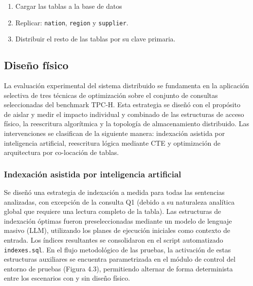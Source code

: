 \documentclass[12pt, letter paper]{report}
\begin{document}
        \begin{enumerate}
          \item Cargar las tablas a la base de datos
          \item Replicar: \texttt{nation}, \texttt{region} y \texttt{supplier}.
          \item Distribuir el resto de las tablas por su clave primaria.
        \end{enumerate}

      \subsection{Diseño físico} %
      \label{sub:diseno_fisico}
        La evaluación experimental del sistema distribuido se fundamenta en la
        aplicación selectiva de tres técnicas de optimización sobre el conjunto
        de consultas seleccionadas del benchmark TPC-H. Esta estrategia se
        diseñó con el propósito de aislar y medir el impacto individual y
        combinado de las estructuras de acceso físico, la reescritura
        algorítmica y la topología de almacenamiento distribuido. Las
        intervenciones se clasifican de la siguiente manera: indexación asistida
        por inteligencia artificial, reescritura lógica mediante CTE y
        optimización de arquitectura por co-locación de tablas.

        \subsubsection{Indexación asistida por inteligencia artificial} %
        \label{ssub:indexación_asistida_por_inteligencia_artificial}
          Se diseñó una estrategia de indexación a medida para todas las
          sentencias analizadas, con excepción de la consulta Q1 (debido a su
          naturaleza analítica global que requiere una lectura completo de la
          tabla). Las estructuras de indexación óptimas fueron preseleccionadas
          mediante un modelo de lenguaje masivo (LLM), utilizando los planes de
          ejecución iniciales como contexto de entrada. Los índices resultantes
          se consolidaron en el script automatizado \texttt{indexes.sql}. En el
          flujo metodológico de las pruebas, la activación de estas estructuras
          auxiliares se encuentra parametrizada en el módulo de control del
          entorno de pruebas (Figura 4.3), permitiendo alternar de forma
          determinista entre los escenarios con y sin diseño físico.
\end{document}
